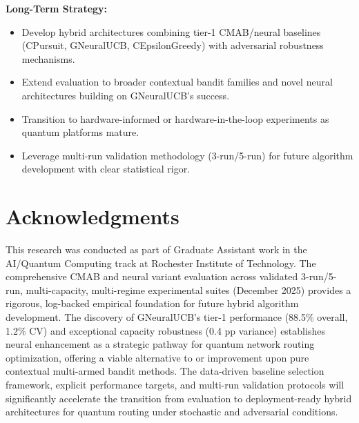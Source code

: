 \documentclass[12pt,a4paper]{article}
\begin{document}
\textbf{Long-Term Strategy:}
\begin{itemize}
\item Develop hybrid architectures combining tier-1 CMAB/neural baselines (CPursuit, GNeuralUCB, CEpsilonGreedy) with adversarial robustness mechanisms.
\item Extend evaluation to broader contextual bandit families and novel neural architectures building on GNeuralUCB's success.
\item Transition to hardware-informed or hardware-in-the-loop experiments as quantum platforms mature.
\item Leverage multi-run validation methodology (3-run/5-run) for future algorithm development with clear statistical rigor.
\end{itemize}

\section{Acknowledgments}

This research was conducted as part of Graduate Assistant work in the AI/Quantum Computing track at Rochester Institute of Technology. The comprehensive CMAB and neural variant evaluation across validated 3-run/5-run, multi-capacity, multi-regime experimental suites (December 2025) provides a rigorous, log-backed empirical foundation for future hybrid algorithm development. The discovery of GNeuralUCB's tier-1 performance (88.5\% overall, 1.2\% CV) and exceptional capacity robustness (0.4 pp variance) establishes neural enhancement as a strategic pathway for quantum network routing optimization, offering a viable alternative to or improvement upon pure contextual multi-armed bandit methods. The data-driven baseline selection framework, explicit performance targets, and multi-run validation protocols will significantly accelerate the transition from evaluation to deployment-ready hybrid architectures for quantum routing under stochastic and adversarial conditions.
\end{document}
